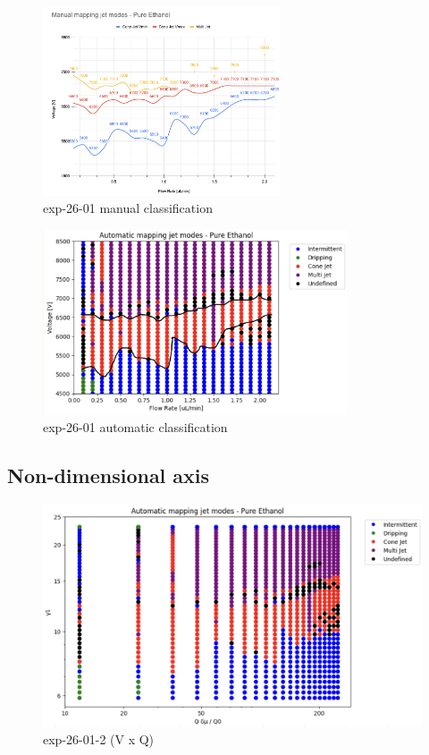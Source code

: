 \begin{multicols}{2}


    \begin{figure}[H]
        \center
        \includegraphics[width=7cm]{Figuras/report4/map7-manual.png}
        \caption{ exp-26-01 manual classification}
    \end{figure}

    \begin{figure}[H]
        \center
        \includegraphics[width=9cm]{Figuras/report4/map7-automatic-line.png}
        \caption{ exp-26-01 automatic classification}
    \end{figure}


\end{multicols}

\subsection{Non-dimensional axis}

\begin{figure}[H]
    \center
    \includegraphics[width=12cm]{Figuras/19:03/non-dimensional-1.png}
    \caption{ exp-26-01-2 (V x Q)}
\end{figure}


